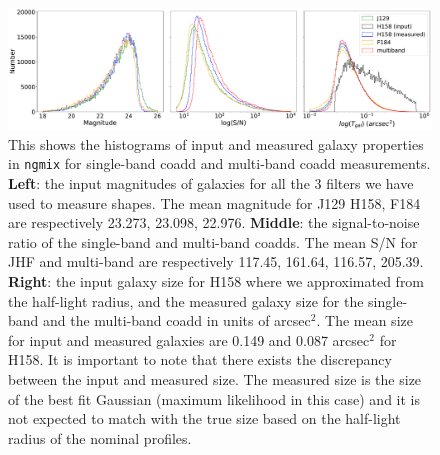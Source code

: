 \documentclass[fleqn,usenatbib]{mnras}
\begin{document}

\begin{figure}
    \centering
	\includegraphics[width=\textwidth]{true_ngmix_measured_properties.pdf}
    \caption{This shows the histograms of input and measured galaxy properties in \texttt{ngmix} for single-band coadd and multi-band coadd measurements. \textbf{Left}: the input magnitudes of galaxies for all the 3 filters we have used to measure shapes. The mean magnitude for J129 H158, F184 are respectively 23.273, 23.098, 22.976. \textbf{Middle}: the signal-to-noise ratio of the single-band and multi-band coadds. The mean S/N for JHF and multi-band are respectively 117.45, 161.64, 116.57, 205.39. \textbf{Right}: the input galaxy size for H158 where we approximated from the half-light radius, and the measured galaxy size for the single-band and the multi-band coadd in units of arcsec$^2$. The mean size for input and measured galaxies are 0.149 and 0.087 arcsec$^2$ for H158. It is important to note that there exists the discrepancy between the input and measured size. The measured size is the size of the best fit Gaussian (maximum likelihood in this case) and it is not expected to match with the true size based on the half-light radius of the nominal profiles.}
    \label{fig:ngmix_measured_properties}
\end{figure}

\end{document}
